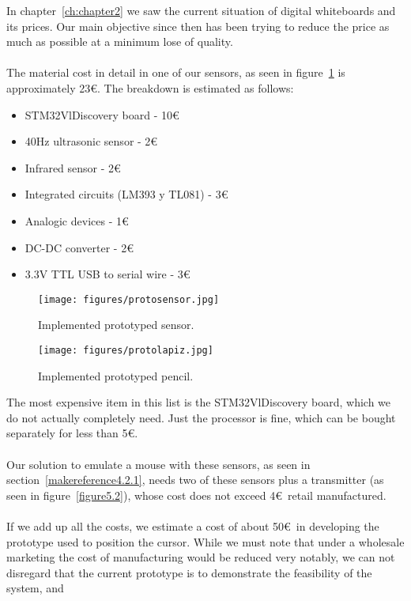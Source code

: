 In chapter~\ref{ch:chapter2} we saw the current situation of digital whiteboards and its prices.
Our main objective since then has been trying to reduce the price as much as possible at a minimum lose of quality.\\ 
\\ 
The material cost in detail in one of our sensors, as seen 
in figure~\ref{figureE.1} is approximately 23\euro. The breakdown 
is estimated as follows:
\\
\begin{itemize}
\item STM32VlDiscovery board - 10\euro
\item 40Hz ultrasonic sensor - 2\euro
\item Infrared sensor - 2\euro
\item Integrated circuits (LM393 y TL081) - 3\euro
\item Analogic devices - 1\euro
\item DC-DC converter - 2\euro
\item 3.3V TTL USB to serial wire - 3\euro
\end{itemize}
\begin{figure}[h]
	\centering
	
	\texttt{[image: figures/protosensor.jpg]}
	\caption{Implemented prototyped sensor.}
	\label{figureE.1}
\end{figure}
\begin{figure}[h]
	\centering
	
	\texttt{[image: figures/protolapiz.jpg]}
	\caption{Implemented prototyped pencil.}
	\label{figureE.2}
\end{figure}
The most expensive item in this list is the STM32VlDiscovery board, which we do not actually completely need. Just the processor is fine, which can be bought separately for less than 5\euro.\\
\\
Our solution to emulate a mouse with these sensors, as seen in section~\ref{makereference4.2.1}, needs two of these sensors plus a transmitter (as seen in figure~\ref{figure5.2}), whose cost does not exceed 4\euro~retail manufactured.\\
\\
If we add up all the costs, we estimate a cost of about 50\euro~in developing the prototype used to position the cursor. While we must 
note that under a wholesale marketing the cost of manufacturing would be reduced very 
notably, we can not disregard that the current prototype is to demonstrate the feasibility of the system, and 
